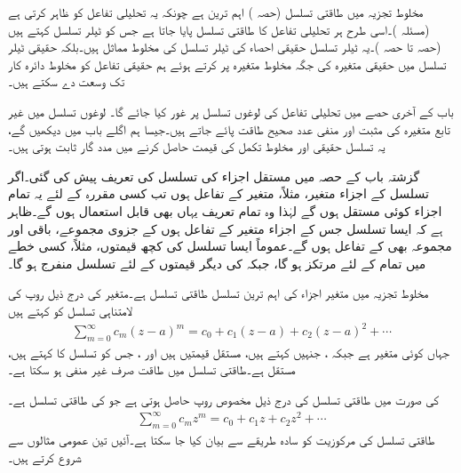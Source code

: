 مخلوط تجزیہ میں طاقتی تسلسل (حصہ )  اہم ترین ہے چونکہ یہ تحلیلی تفاعل کو ظاہر کرتی ہے (مسئلہ )۔اسی طرح ہر تحلیلی تفاعل کا طاقتی تسلسل پایا جاتا ہے جس کو ٹیلر تسلسل کہتے ہیں (حصہ  تا حصہ )۔یہ  ٹیلر تسلسل حقیقی احصاء کی ٹیلر تسلسل کی مخلوط مماثل ہیں۔بلکہ حقیقی ٹیلر تسلسل میں حقیقی متغیرہ کی جگہ مخلوط متغیرہ پر کرتے ہوئے ہم حقیقی تفاعل کو مخلوط دائرہ کار تک وسعت دے سکتے ہیں۔

باب کے آخری حصے میں تحلیلی تفاعل کی لوغوں تسلسل پر غور کیا جائے گا۔ لوغوں تسلسل میں غیر تابع متغیرہ کی مثبت اور منفی عدد صحیح طاقت پائے جاتے ہیں۔جیسا ہم اگلے باب میں دیکھیں گے، یہ تسلسل حقیقی اور مخلوط تکمل کی قیمت حاصل کرنے میں مدد گار ثابت ہوتی ہیں۔

گزشتہ باب کے حصہ  میں مستقل اجزاء کی تسلسل کی تعریف پیش کی گئی۔اگر تسلسل کے اجزاء متغیر، مثلاً، متغیر  کے تفاعل  ہوں تب کسی مقررہ  کے لئے یہ تمام اجزاء کوئی مستقل ہوں گے لہٰذا وہ تمام تعریف یہاں بھی قابل استعمال ہوں گے۔ظاہر ہے کہ ایسا تسلسل جس کے اجزاء متغیر  کے تفاعل ہوں کے جزوی مجموعے، باقی اور مجموعہ بھی  کے تفاعل ہوں گے۔عموماً ایسا تسلسل  کی کچھ قیمتوں، مثلاً، کسی خطے میں تمام   کے لئے مرتکز ہو گا، جبکہ  کی دیگر قیمتوں کے لئے تسلسل منفرج ہو گا۔ 

مخلوط تجزیہ میں متغیر اجزاء کی اہم ترین تسلسل طاقتی تسلسل ہے۔متغیر   کی   درج ذیل روپ کی لامتناہی تسلسل کو کہتے ہیں
\begin{align}\label{مساوات_ٹیلر_طاقتی_تسلسل_الف}
\sum\limits_{m=0}^{\infty} c_m(z-a)^m=c_0+c_1(z-a)+c_2(z-a)^2+\cdots
\end{align}
 جہاں  کوئی متغیر ہے جبکہ ، جنہیں  کہتے ہیں، مستقل قیمتیں ہیں اور ، جس کو تسلسل کا  کہتے ہیں، مستقل ہے۔طاقتی تسلسل  میں طاقت  صرف غیر منفی ہو سکتا ہے۔

 کی صورت میں طاقتی تسلسل کی درج ذیل مخصوص روپ حاصل ہوتی ہے جو  کی طاقتی تسلسل ہے۔
\begin{align}\label{مساوات_ٹیلر_طاقتی_تسلسل_ب}
\sum\limits_{m=0}^{\infty} c_mz^m=c_0+c_1z+c_2z^2+\cdots
\end{align}
 طاقتی تسلسل کی مرکوزیت کو سادہ طریقے سے بیان کیا جا سکتا ہے۔آئیں تین عمومی مثالوں سے شروع کرتے ہیں۔

